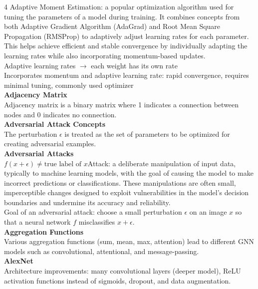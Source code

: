 \documentclass[8pt]{extarticle}
\begin{document}
\begin{multicols}{4}
Adaptive Moment Estimation: a popular optimization algorithm used for tuning the parameters of a model during training. It combines concepts from both Adaptive Gradient Algorithm (AdaGrad) and Root Mean Square Propagation (RMSProp) to adaptively adjust learning rates for each parameter. This helps achieve efficient and stable convergence by individually adapting the learning rates while also incorporating momentum-based updates.\\
Adaptive learning rates $\rightarrow$ each weight has its own rate\\
Incorporates momentum and adaptive learning rate: rapid convergence, requires minimal tuning, commonly used optimizer\\
\vspace{2pt}\textbf{Adjacency Matrix}\\
Adjacency matrix is a binary matrix where 1 indicates a connection between nodes and 0 indicates no connection.\\
\vspace{2pt}\textbf{Adversarial Attack Concepts}\\
The perturbation $\epsilon$ is treated as the set of parameters to be optimized for creating adversarial examples.\\
\vspace{2pt}\textbf{Adversarial Attacks}\\
$f(x + \epsilon) \neq \text{true label of } x$\Adversarial Attack: a deliberate manipulation of input data, typically to machine learning models, with the goal of causing the model to make incorrect predictions or classifications. These manipulations are often small, imperceptible changes designed to exploit vulnerabilities in the model's decision boundaries and undermine its accuracy and reliability.\\
Goal of an adversarial attack: choose a small perturbation $\epsilon$ on an image $ x$ so that a neural network $ f$ misclassifies $ x+\epsilon$.\\
\vspace{2pt}\textbf{Aggregation Functions}\\
Various aggregation functions (sum, mean, max, attention) lead to different GNN models such as convolutional, attentional, and message-passing.\\
\vspace{2pt}\textbf{AlexNet}\\
Architecture improvements: many convolutional layers (deeper model), ReLU activation functions instead of sigmoids, dropout, and data augmentation.\\

\end{multicols}
\end{document}
